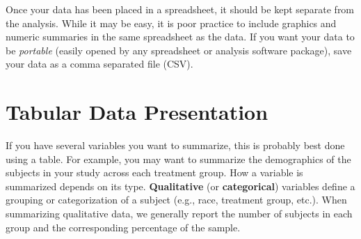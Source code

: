\documentclass[
]{book}
\theoremstyle{plain}
\theoremstyle{mydefn}
\theoremstyle{myexmpl}
\theoremstyle{remark}
\begin{document}
\begin{table}

\caption{\label{tab:statistical-process-tidy-data}Example of storing data according to "tidy data" principles.  Data is from a hypothetical study.}
\centering
{}
\end{table}

Once your data has been placed in a spreadsheet, it should be kept separate from the analysis. While it may be easy, it is poor practice to include graphics and numeric summaries in the same spreadsheet as the data. If you want your data to be \emph{portable} (easily opened by any spreadsheet or analysis software package), save your data as a comma separated file (CSV).

\hypertarget{tabular-data-presentation}{%
\section{Tabular Data Presentation}\label{tabular-data-presentation}}

If you have several variables you want to summarize, this is probably best done using a table. For example, you may want to summarize the demographics of the subjects in your study across each treatment group. How a variable is summarized depends on its type. \textbf{Qualitative} (or \textbf{categorical}) variables define a grouping or categorization of a subject (e.g., race, treatment group, etc.). When summarizing qualitative data, we generally report the number of subjects in each group and the corresponding percentage of the sample.
\end{document}
